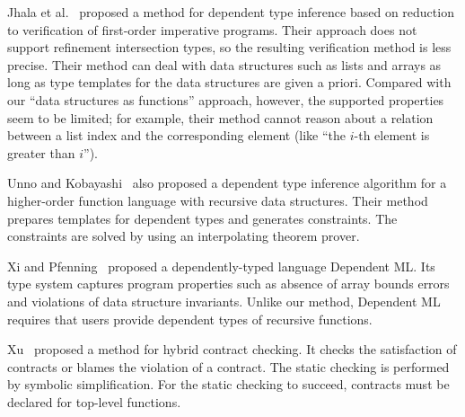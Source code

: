 
Jhala et al.~\cite{Jhala2011} proposed a method for dependent type inference
based on reduction to verification of first-order imperative programs.
Their approach does not support refinement intersection types, so
the resulting verification method is less precise.
Their method can deal with data structures such as lists and arrays
as long as type templates for the data structures are given a priori.
Compared with our ``data structures as functions'' approach, however,
the supported properties seem to be limited; for example, their method
cannot reason about a relation between a list index and the corresponding
element (like ``the \(i\)-th element is greater than \(i\)'').

Unno and Kobayashi~\cite{Unno2009} also proposed a dependent type
inference algorithm for a higher-order function language with recursive
data structures.  Their method prepares templates for dependent types
and generates constraints.  The constraints are solved by using an
interpolating theorem prover.

Xi and Pfenning~\cite{Xi1999} proposed a dependently-typed language
Dependent ML.  Its type system captures program properties such as
absence of array bounds errors and violations of data structure
invariants.  Unlike our method, Dependent ML requires that users provide
dependent types of recursive functions.

Xu~\cite{Xu2009,Xu2012} proposed a method for hybrid contract
checking.  It checks the satisfaction of contracts or blames the
violation of a contract.  The static checking is performed by symbolic
simplification.  For the static checking to succeed, contracts must be
declared for top-level functions.

